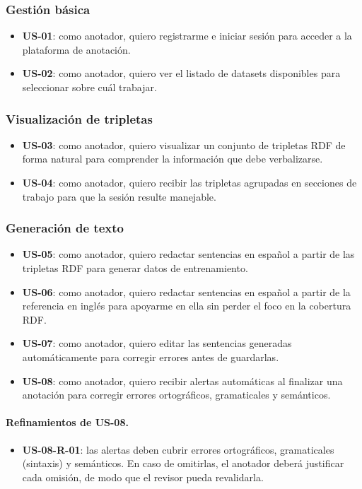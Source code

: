 \subsubsection{Gestión básica}
\begin{itemize}
	\item \textbf{US-01}: como anotador, quiero registrarme e iniciar sesión para acceder
	      a la plataforma de anotación.
	\item \textbf{US-02}: como anotador, quiero ver el listado de datasets disponibles
	      para seleccionar sobre cuál trabajar.
\end{itemize}

\subsubsection{Visualización de tripletas}
\begin{itemize}
	\item \textbf{US-03}: como anotador, quiero visualizar un conjunto de tripletas RDF
	      de forma natural para comprender la información que debe verbalizarse.
	\item \textbf{US-04}: como anotador, quiero recibir las tripletas agrupadas en
	      secciones de trabajo para que la sesión resulte manejable.
\end{itemize}

\subsubsection{Generación de texto}
\begin{itemize}
	\item \textbf{US-05}: como anotador, quiero redactar sentencias en español a partir
	      de las tripletas RDF para generar datos de entrenamiento.
	\item \textbf{US-06}: como anotador, quiero redactar sentencias en español a partir
	      de la referencia en inglés para apoyarme en ella sin perder el foco en la
	      cobertura RDF.
	\item \textbf{US-07}: como anotador, quiero editar las sentencias generadas
	      automáticamente para corregir errores antes de guardarlas.
	\item \textbf{US-08}: como anotador, quiero recibir alertas automáticas al finalizar
	      una anotación para corregir errores ortográficos, gramaticales y semánticos.
\end{itemize}

\paragraph{Refinamientos de US-08.}
\begin{itemize}
	\item \textbf{US-08-R-01}: las alertas deben cubrir errores ortográficos,
	      gramaticales (sintaxis) y semánticos. En caso de omitirlas, el anotador deberá
	      justificar cada omisión, de modo que el revisor pueda revalidarla.
\end{itemize}

